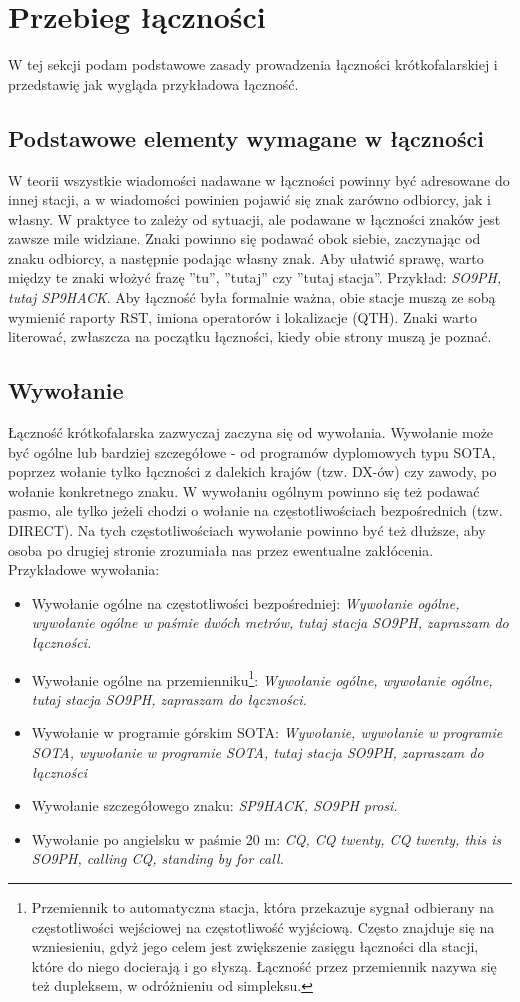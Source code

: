 \documentclass[a4paper,11pt]{article}
\begin{document}
\section{Przebieg łączności}
W tej sekcji podam podstawowe zasady prowadzenia łączności krótkofalarskiej i przedstawię jak wygląda przykładowa łączność.
\subsection{Podstawowe elementy wymagane w łączności}
W teorii wszystkie wiadomości nadawane w łączności powinny być adresowane do innej stacji, a w wiadomości powinien pojawić się znak zarówno odbiorcy, jak i własny. W praktyce to zależy od sytuacji, ale podawane w łączności znaków jest zawsze mile widziane. Znaki powinno się podawać obok siebie, zaczynając od znaku odbiorcy, a następnie podając własny znak. Aby ułatwić sprawę, warto między te znaki włożyć frazę ''tu'', ''tutaj'' czy ''tutaj stacja''. Przykład: \textit{SO9PH, tutaj SP9HACK}. Aby łączność była formalnie ważna, obie stacje muszą ze sobą wymienić raporty RST, imiona operatorów i lokalizacje (QTH). Znaki warto literować, zwłaszcza na początku łączności, kiedy obie strony muszą je poznać.
\subsection{Wywołanie}
Łączność krótkofalarska zazwyczaj zaczyna się od wywołania. Wywołanie może być ogólne lub bardziej szczegółowe - od programów dyplomowych typu SOTA, poprzez wołanie tylko łączności z dalekich krajów (tzw. DX-ów) czy zawody, po wołanie konkretnego znaku. W wywołaniu ogólnym powinno się też podawać pasmo, ale tylko jeżeli chodzi o wołanie na częstotliwościach bezpośrednich (tzw. DIRECT). Na tych częstotliwościach wywołanie powinno być też dłuższe, aby osoba po drugiej stronie zrozumiała nas przez ewentualne zakłócenia. Przykładowe wywołania:
\begin{itemize}
\item Wywołanie ogólne na częstotliwości bezpośredniej: \textit{Wywołanie ogólne, wywołanie ogólne w paśmie dwóch metrów, tutaj stacja SO9PH, zapraszam do łączności.}
\item Wywołanie ogólne na przemienniku\footnote{Przemiennik to automatyczna stacja, która przekazuje sygnał odbierany na częstotliwości wejściowej na częstotliwość wyjściową. Często znajduje się na wzniesieniu, gdyż jego celem jest zwiększenie zasięgu łączności dla stacji, które do niego docierają i go słyszą. Łączność przez przemiennik nazywa się też dupleksem, w odróżnieniu od simpleksu.}: \textit{Wywołanie ogólne, wywołanie ogólne, tutaj stacja SO9PH, zapraszam do łączności.}
\item Wywołanie w programie górskim SOTA: \textit{Wywołanie, wywołanie w programie SOTA, wywołanie w programie SOTA, tutaj stacja SO9PH, zapraszam do łączności}
\item Wywołanie szczegółowego znaku: \textit{SP9HACK, SO9PH prosi.}
\item Wywołanie po angielsku w paśmie 20 m: \textit{CQ, CQ twenty, CQ twenty, this is SO9PH, calling CQ, standing by for call.}
\end{itemize}
\end{document}
